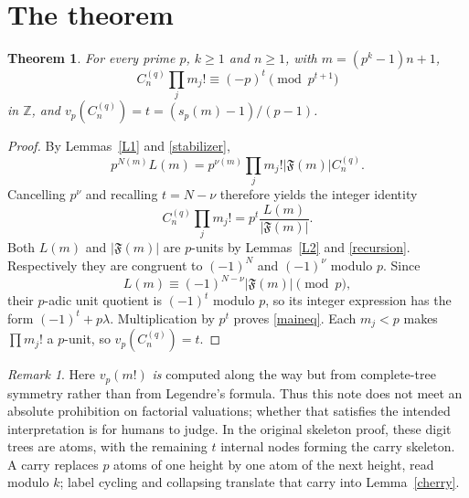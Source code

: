 \documentclass[10pt]{article}
\newtheorem{theorem}{Theorem}
\theoremstyle{definition}\newtheorem*{definition}{Definition}
\theoremstyle{remark}\newtheorem*{remark}{Remark}
\newcommand{\F}{\mathfrak F}
\begin{document}
\section{The theorem}
\begin{theorem}\label{main} For every prime $p$, $k\ge1$ and $n\ge1$,
with $m=(p^k-1)n+1$,
\begin{equation}\label{maineq}
 \boxed{C_n^{(q)}\prod_jm_j!\equiv(-p)^t\pmod{p^{t+1}}}
\end{equation}
in $\mathbb Z$, and $v_p(C_n^{(q)})=t=(s_p(m)-1)/(p-1)$.\end{theorem}
\begin{proof} By Lemmas~\ref{L1} and \ref{stabilizer},
\[
 p^{N(m)}L(m)=p^{\nu(m)}\prod_jm_j!|\F(m)|C_n^{(q)}.
\]
Cancelling $p^\nu$ and recalling $t=N-\nu$ therefore yields the integer
identity
\[
 C_n^{(q)}\prod_jm_j!=p^t\frac{L(m)}{|\F(m)|}.
\]
Both $L(m)$ and $|\F(m)|$ are $p$-units by Lemmas~\ref{L2} and \ref{recursion}.
Respectively they are congruent to $(-1)^N$ and $(-1)^\nu$ modulo $p$.
Since
\[
 L(m)\equiv(-1)^{N-\nu}|\F(m)|\pmod p,
\]
their $p$-adic unit quotient is $(-1)^t$ modulo $p$, so its integer expression
has the form $(-1)^t+p\lambda$. Multiplication by $p^t$ proves \eqref{maineq}.
Each $m_j<p$ makes $\prod m_j!$ a $p$-unit, so $v_p(C_n^{(q)})=t$.\end{proof}
\begin{remark}\label{qualification} Here $v_p(m!)$ \emph{is} computed along the
way but from complete-tree symmetry rather than from Legendre's formula. Thus
this note does not meet an absolute prohibition on factorial valuations;
whether that satisfies the intended interpretation is for humans to judge.
In the original skeleton proof, these digit trees are atoms, with the remaining
$t$ internal nodes forming the carry skeleton. A carry replaces $p$ atoms of
one height by one atom of the next height, read modulo $k$; label cycling
and collapsing translate that carry into Lemma~\ref{cherry}.\end{remark}
\end{document}

